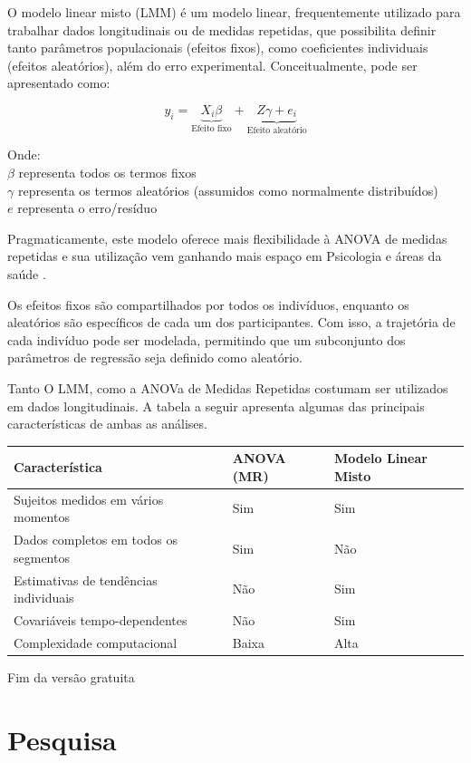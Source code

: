\documentclass[
]{book}
\begin{document}
O modelo linear misto (LMM) é um modelo linear, frequentemente utilizado para trabalhar dados longitudinais ou de medidas repetidas, que possibilita definir tanto parâmetros populacionais (efeitos fixos), como coeficientes individuais (efeitos aleatórios), além do erro experimental. Conceitualmente, pode ser apresentado como:

\[y_i = \underbrace{X_i\beta}_\text{Efeito fixo} + \underbrace{Z\gamma + e_i}_\text{Efeito aleatório}\]

Onde:\\
\(\beta\) representa todos os termos fixos\\
\(\gamma\) representa os termos aleatórios (assumidos como normalmente distribuídos)\\
\(e\) representa o erro/resíduo

Pragmaticamente, este modelo oferece mais flexibilidade à ANOVA de medidas repetidas e sua utilização vem ganhando mais espaço em Psicologia e áreas da saúde \citep{Gueorguieva2004}.

Os efeitos fixos são compartilhados por todos os indivíduos, enquanto os aleatórios são específicos de cada um dos participantes. Com isso, a trajetória de cada indivíduo pode ser modelada, permitindo que um subconjunto dos parâmetros de regressão seja definido como aleatório.

Tanto O LMM, como a ANOVa de Medidas Repetidas costumam ser utilizados em dados longitudinais. A tabela a seguir apresenta algumas das principais características de ambas as análises.

\begin{longtable}[]{@{}lll@{}}
\toprule
Característica & ANOVA (MR) & Modelo Linear Misto \\
\midrule
\endhead
Sujeitos medidos em vários momentos & Sim & Sim \\
Dados completos em todos os segmentos & Sim & Não \\
Estimativas de tendências individuais & Não & Sim \\
Covariáveis tempo-dependentes & Não & Sim \\
Complexidade computacional & Baixa & Alta \\
\bottomrule
\end{longtable}

Fim da versão gratuita

\hypertarget{pesquisa-7}{%
\section{Pesquisa}\label{pesquisa-7}}
\end{document}
